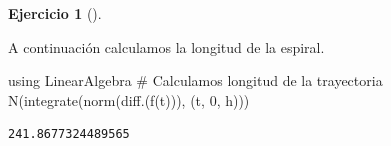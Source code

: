 \documentclass[
  a4paper,
]{scrreport}
\newenvironment{Shaded}{\begin{snugshade}}{\end{snugshade}}
\newcommand{\BuiltInTok}[1]{\textcolor[rgb]{0.00,0.23,0.31}{#1}}
\newcommand{\CommentTok}[1]{\textcolor[rgb]{0.37,0.37,0.37}{#1}}
\newcommand{\FloatTok}[1]{\textcolor[rgb]{0.68,0.00,0.00}{#1}}
\newcommand{\FunctionTok}[1]{\textcolor[rgb]{0.28,0.35,0.67}{#1}}
\newcommand{\ImportTok}[1]{\textcolor[rgb]{0.00,0.46,0.62}{#1}}
\newcommand{\NormalTok}[1]{\textcolor[rgb]{0.00,0.23,0.31}{#1}}
\theoremstyle{definition}
\newtheorem{exercise}{Ejercicio}[chapter]
\theoremstyle{remark}
\begin{document}
\begin{exercise}[]
\begin{tcolorbox}
A continuación calculamos la longitud de la espiral.

\begin{Shaded}
\begin{Highlighting}[]
\ImportTok{using} \BuiltInTok{LinearAlgebra}
\CommentTok{\# Calculamos longitud de la trayectoria}
\FunctionTok{N}\NormalTok{(}\FunctionTok{integrate}\NormalTok{(}\FunctionTok{norm}\NormalTok{(}\FunctionTok{diff}\NormalTok{.(}\FunctionTok{f}\NormalTok{(t))), (t, }\FloatTok{0}\NormalTok{, h)))}
\end{Highlighting}
\end{Shaded}

\begin{verbatim}
241.8677324489565
\end{verbatim}

\end{tcolorbox}

\end{exercise}
\end{document}
